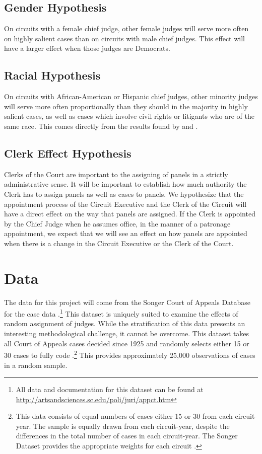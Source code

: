 \documentclass[12pt]{article}
\begin{document}
\subsection*{Gender Hypothesis}
On circuits with a female chief judge, other female judges will serve more often on highly salient cases than on circuits with male chief judges.  This effect will have a larger effect when those judges are Democrats.

\subsection*{Racial Hypothesis}
On circuits with African-American or Hispanic chief judges, other minority judges will serve more often proportionally than they should in the majority in highly salient cases, as well as cases which involve civil rights or litigants who are of the same race.  This comes directly from the results found by \citet{Atkins1974} and \citet{Brown2000}.

\subsection*{Clerk Effect Hypothesis}
Clerks of the Court are important to the assigning of panels in a strictly administrative sense.  It will be important to establish how much authority the Clerk has to assign panels as well as cases to panels.  We hypothesize that the appointment process of the Circuit Executive and the Clerk of the Circuit will have a direct effect on the way that panels are assigned.  If the Clerk is appointed by the Chief Judge when he assumes office, in the manner of a patronage appointment, we expect that we will see an effect on how panels are appointed when there is a change in the Circuit Executive or the Clerk of the Court.

\section{Data}\label{Data}
The data for this project will come from the Songer Court of Appeals Database for the case data \citep{Songer2007}.\footnote{All data and documentation for this dataset can be found at \url{http://artsandsciences.sc.edu/poli/juri/appct.htm}}  This dataset is uniquely suited to examine the effects of random assignment of judges.  While the stratification of this data presents an interesting methodological challenge, it cannot be overcome.  This dataset takes all Court of Appeals cases decided since 1925 and randomly selects either 15 or 30 cases to fully code \citep{hurwitz2006institutional,hurtwitz2012changes}.\footnote{This data consists of equal numbers of cases either 15 or 30 from each circuit-year.  The sample is equally drawn from each circuit-year, despite the differences in the total number of cases in each circuit-year.  The Songer Dataset provides the appropriate weights for each circuit \citep{Songer2007}.}  This provides approximately 25,000 observations of cases in a random sample.   
\end{document}
